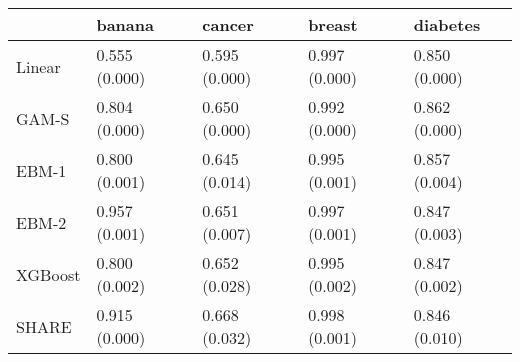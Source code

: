 \begin{tabular}{lllll}
\toprule
{} &         banana &         cancer &         breast &       diabetes \\
\midrule
Linear  &  0.555 (0.000) &  0.595 (0.000) &  0.997 (0.000) &  0.850 (0.000) \\
GAM-S   &  0.804 (0.000) &  0.650 (0.000) &  0.992 (0.000) &  0.862 (0.000) \\
EBM-1   &  0.800 (0.001) &  0.645 (0.014) &  0.995 (0.001) &  0.857 (0.004) \\
EBM-2   &  0.957 (0.001) &  0.651 (0.007) &  0.997 (0.001) &  0.847 (0.003) \\
XGBoost &  0.800 (0.002) &  0.652 (0.028) &  0.995 (0.002) &  0.847 (0.002) \\
SHARE   &  0.915 (0.000) &  0.668 (0.032) &  0.998 (0.001) &  0.846 (0.010) \\
\bottomrule
\end{tabular}
